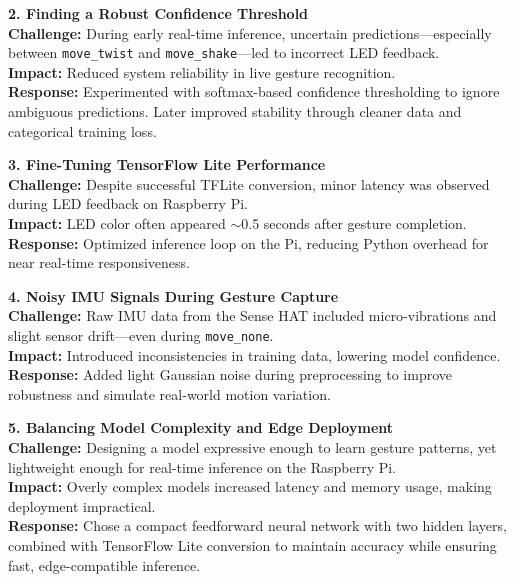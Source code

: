 \documentclass[a4paper,12pt]{article}
\begin{document}
\textbf{2. Finding a Robust Confidence Threshold} \\
\textbf{Challenge:} During early real-time inference, uncertain predictions—especially between \texttt{move\_twist} and \texttt{move\_shake}—led to incorrect LED feedback. \\
\textbf{Impact:} Reduced system reliability in live gesture recognition. \\
\textbf{Response:} Experimented with softmax-based confidence thresholding to ignore ambiguous predictions. Later improved stability through cleaner data and categorical training loss.

\vspace{1em}

\textbf{3. Fine-Tuning TensorFlow Lite Performance} \\
\textbf{Challenge:} Despite successful TFLite conversion, minor latency was observed during LED feedback on Raspberry Pi. \\
\textbf{Impact:} LED color often appeared $\sim$0.5 seconds after gesture completion. \\
\textbf{Response:} Optimized inference loop on the Pi, reducing Python overhead for near real-time responsiveness.

\vspace{1em}

\textbf{4. Noisy IMU Signals During Gesture Capture} \\
\textbf{Challenge:} Raw IMU data from the Sense HAT included micro-vibrations and slight sensor drift—even during \texttt{move\_none}. \\
\textbf{Impact:} Introduced inconsistencies in training data, lowering model confidence. \\
\textbf{Response:} Added light Gaussian noise during preprocessing to improve robustness and simulate real-world motion variation.

\vspace{1em}

\textbf{5. Balancing Model Complexity and Edge Deployment} \\
\textbf{Challenge:} Designing a model expressive enough to learn gesture patterns, yet lightweight enough for real-time inference on the Raspberry Pi. \\
\textbf{Impact:} Overly complex models increased latency and memory usage, making deployment impractical. \\
\textbf{Response:} Chose a compact feedforward neural network with two hidden layers, combined with TensorFlow Lite conversion to maintain accuracy while ensuring fast, edge-compatible inference.
\end{document}
